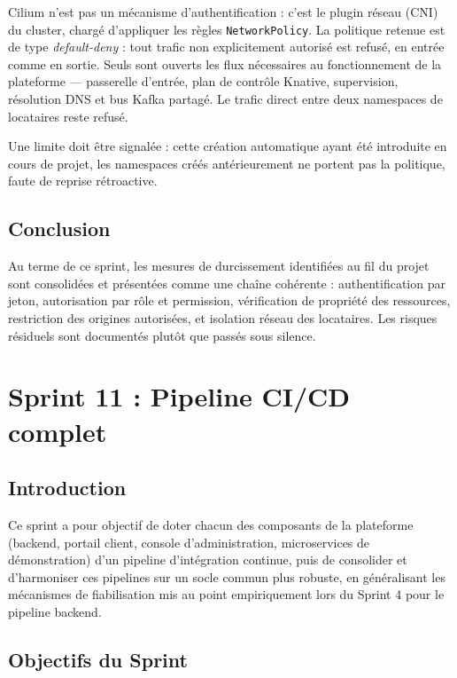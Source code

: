 Cilium n'est pas un mécanisme d'authentification : c'est le plugin réseau (CNI) du cluster, chargé d'appliquer les règles \texttt{NetworkPolicy}. La politique retenue est de type \textit{default-deny} : tout trafic non explicitement autorisé est refusé, en entrée comme en sortie. Seuls sont ouverts les flux nécessaires au fonctionnement de la plateforme — passerelle d'entrée, plan de contrôle Knative, supervision, résolution DNS et bus Kafka partagé. Le trafic direct entre deux namespaces de locataires reste refusé.

Une limite doit être signalée : cette création automatique ayant été introduite en cours de projet, les namespaces créés antérieurement ne portent pas la politique, faute de reprise rétroactive.

\subsection{Conclusion}

Au terme de ce sprint, les mesures de durcissement identifiées au fil du projet sont consolidées et présentées comme une chaîne cohérente : authentification par jeton, autorisation par rôle et permission, vérification de propriété des ressources, restriction des origines autorisées, et isolation réseau des locataires. Les risques résiduels sont documentés plutôt que passés sous silence.

\section{Sprint 11 : Pipeline CI/CD complet}

\subsection{Introduction}

Ce sprint a pour objectif de doter chacun des composants de la plateforme (backend, portail client, console d'administration, microservices de démonstration) d'un pipeline d'intégration continue, puis de consolider et d'harmoniser ces pipelines sur un socle commun plus robuste, en généralisant les mécanismes de fiabilisation mis au point empiriquement lors du Sprint 4 pour le pipeline backend.

\subsection{Objectifs du Sprint}

